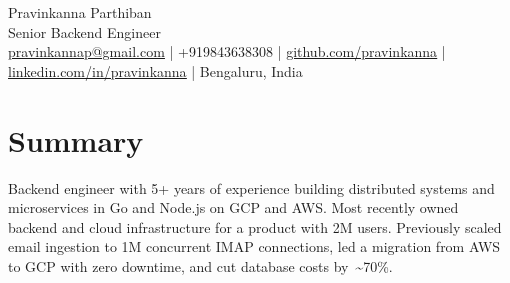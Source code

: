 \documentclass[]{resume-openfont}
\begin{document}
{\centering
    \Huge Pravinkanna Parthiban \\ \vspace{1pt}
    \LARGE Senior Backend Engineer \\ \vspace{6pt}
    \small \href{mailto:pravinkannap@gmail.com}{\underline{pravinkannap@gmail.com}} |
    \small +919843638308 |
    \href{https://github.com/pravinkanna}{\underline{github.com/pravinkanna}} |
    \href{https://www.linkedin.com/in/pravinkanna}{\underline{linkedin.com/in/pravinkanna}} |
    Bengaluru, India

\par}
\sectionsep

\section{Summary}
{\bodyfont Backend engineer with 5+ years of experience building distributed systems and microservices in Go and Node.js on GCP and AWS. Most recently owned backend and cloud infrastructure for a product with 2M users. Previously scaled email ingestion to 1M concurrent IMAP connections, led a migration from AWS to GCP with zero downtime, and cut database costs by~\textasciitilde 70\%.\par}
\sectionsep

\end{document}
